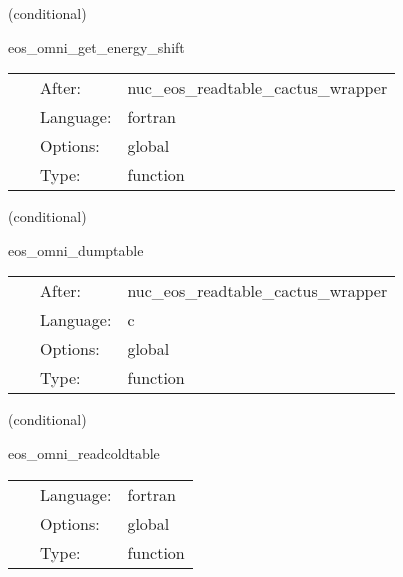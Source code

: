 \vspace{5mm}

   (conditional) 

\hspace{5mm} eos\_omni\_get\_energy\_shift 

\hspace{5mm}{\it setup energy\_shift in eos\_omni\_module } 


\hspace{5mm}

 \begin{tabular*}{160mm}{cll} 
~ & After:  & nuc\_eos\_readtable\_cactus\_wrapper \\ 
~ & Language:  & fortran \\ 
~ & Options:  & global \\ 
~ & Type:  & function \\ 
\end{tabular*} 


\vspace{5mm}

   (conditional) 

\hspace{5mm} eos\_omni\_dumptable 

\hspace{5mm}{\it dump eos hdf5 table in ascii } 


\hspace{5mm}

 \begin{tabular*}{160mm}{cll} 
~ & After:  & nuc\_eos\_readtable\_cactus\_wrapper \\ 
~ & Language:  & c \\ 
~ & Options:  & global \\ 
~ & Type:  & function \\ 
\end{tabular*} 


\vspace{5mm}

   (conditional) 

\hspace{5mm} eos\_omni\_readcoldtable 

\hspace{5mm}{\it read cold eos ascii table } 


\hspace{5mm}

 \begin{tabular*}{160mm}{cll} 
~ & Language:  & fortran \\ 
~ & Options:  & global \\ 
~ & Type:  & function \\ 
\end{tabular*} 


